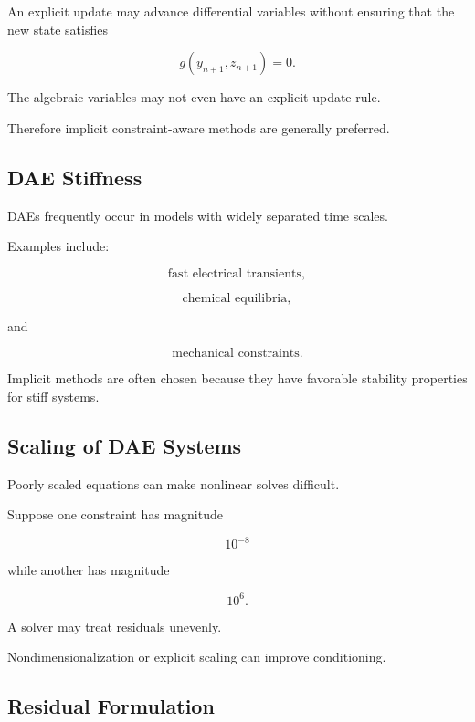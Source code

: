 An explicit update may advance differential variables without ensuring
that the new state satisfies

\[
\boxed{
g(y_{n+1},z_{n+1})=0.
}
\]

The algebraic variables may not even have an explicit update rule.

Therefore implicit constraint-aware methods are generally preferred.

\subsection{DAE Stiffness}
\label{subsec:dae-stiffness}

DAEs frequently occur in models with widely separated time scales.

Examples include:

\[
\boxed{
\text{fast electrical transients},
}
\]

\[
\boxed{
\text{chemical equilibria},
}
\]

and

\[
\boxed{
\text{mechanical constraints}.
}
\]

Implicit methods are often chosen because they have favorable stability
properties for stiff systems.

\subsection{Scaling of DAE Systems}
\label{subsec:dae-scaling}

Poorly scaled equations can make nonlinear solves difficult.

Suppose one constraint has magnitude

\[
10^{-8}
\]

while another has magnitude

\[
10^6.
\]

A solver may treat residuals unevenly.

Nondimensionalization or explicit scaling can improve conditioning.

\subsection{Residual Formulation}
\label{subsec:dae-residual-formulation}

